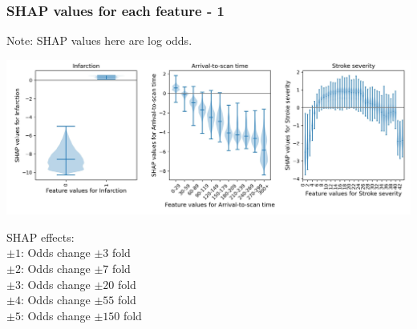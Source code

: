 \begin{frame}
\frametitle{SHAP values for each feature - 1}
Note: SHAP values here are log odds. 
\begin{center}
\includegraphics[width=1.0\textwidth]{./images/03d_xgb_10_features_thrombolysis_shap_violin_1.jpg}
\end{center}

\scriptsize
SHAP effects: \\
$\pm1$: Odds change $\pm3$ fold\\
$\pm2$: Odds change $\pm7$ fold\\
$\pm3$: Odds change $\pm20$ fold\\
$\pm4$: Odds change $\pm55$ fold\\
$\pm5$: Odds change $\pm150$ fold
\end{frame}